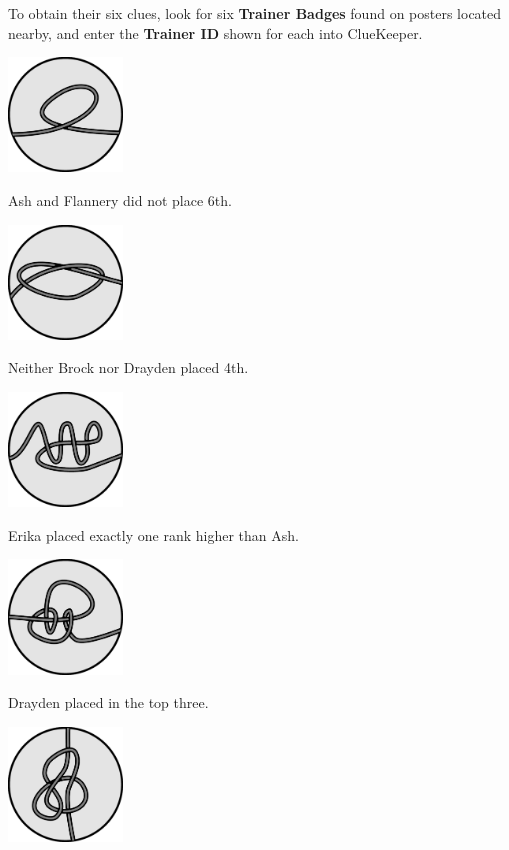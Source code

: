 \documentclass{puzzlehunt}
\begin{document}
To obtain their six clues, look for six \textbf{Trainer Badges} found on posters located nearby, and enter the \textbf{Trainer ID} shown for each into ClueKeeper.

\vfill


\begin{multicols}{3}\footnotesize
  \begin{center}
    \includegraphics[width=1.2in]{assets/unknot1.pdf}

    Ash and Flannery did not place 6th.


    \includegraphics[width=1.2in]{assets/knot1.pdf}

    Neither Brock nor Drayden placed 4th.


    \includegraphics[width=1.2in]{assets/unknot2.pdf}

    Erika placed exactly one rank higher than Ash.


    \includegraphics[width=1.2in]{assets/knot2.pdf}

    Drayden placed in the top three.


    \includegraphics[width=1.2in]{assets/knot3.pdf}


\end{center}
\end{multicols}
\end{document}
